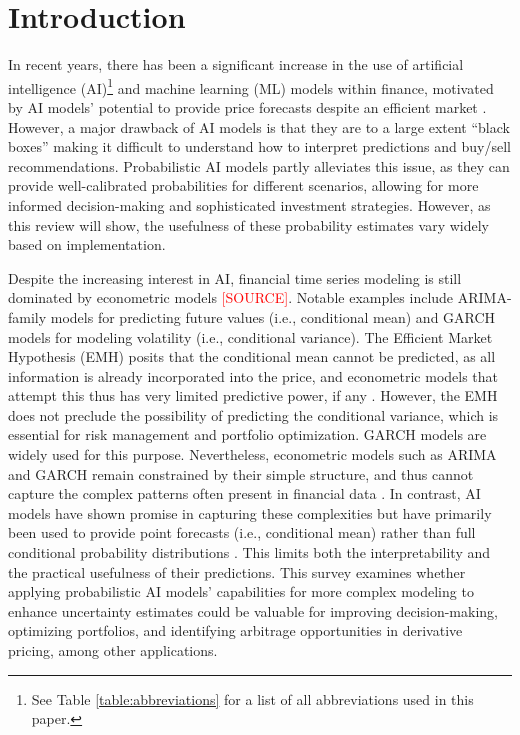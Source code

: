 \section{Introduction}
\label{sec:introduction}
In recent years, there has been a significant increase in the use of artificial intelligence (AI)\footnote{See Table \ref{table:abbreviations} for a list of all abbreviations used in this paper.
} and machine learning (ML) models within finance, motivated by AI models' potential to provide price forecasts despite an efficient market \parencite{sezer2020financial}. However, a major drawback of AI models is that they are to a large extent ``black boxes'' making it difficult to understand how to interpret predictions and buy/sell recommendations. Probabilistic AI models partly alleviates this issue, as they can provide well-calibrated probabilities for different scenarios, allowing for more informed decision-making and sophisticated investment strategies. However, as this review will show, the usefulness of these probability estimates vary widely based on implementation.

Despite the increasing interest in AI, financial time series modeling is still dominated by econometric models \textcolor{red}{[SOURCE]}. Notable examples include ARIMA-family models for predicting future values (i.e., conditional mean) and GARCH models for modeling volatility (i.e., conditional variance). The Efficient Market Hypothesis (EMH) posits that the conditional mean cannot be predicted, as all information is already incorporated into the price, and econometric models that attempt this thus has very limited predictive power, if any \parencite{Campbell2007}. However, the EMH does not preclude the possibility of predicting the conditional variance, which is essential for risk management and portfolio optimization. GARCH models are widely used for this purpose. Nevertheless, econometric models such as ARIMA and GARCH remain constrained by their simple structure, and thus cannot capture the complex patterns often present in financial data \parencite{sezer2020financial}. In contrast, AI models have shown promise in capturing these complexities but have primarily been used to provide point forecasts (i.e., conditional mean) rather than full conditional probability distributions \parencite{Tang2022Survey}. This limits both the interpretability and the practical usefulness of their predictions. This survey examines whether applying probabilistic AI models' capabilities for more complex modeling to enhance uncertainty estimates could be valuable for improving decision-making, optimizing portfolios, and identifying arbitrage opportunities in derivative pricing, among other applications.

